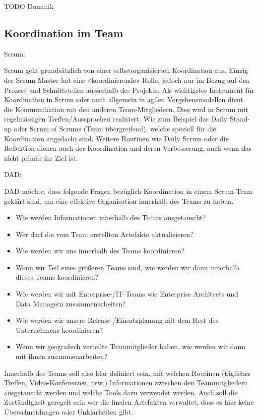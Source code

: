 TODO Dominik



\subsection{Koordination im Team}



{\Large Scrum:} \cite{planningReleaseScrum} \medskip

Scrum geht grundsätzlich von einer selbstorganisierten Koordination aus. Einzig der Scrum Master hat eine «koordinierende» Rolle, jedoch nur im Bezug auf den Prozess und Schnittstellen ausserhalb des Projekts.
Als wichtigstes Instrument für Koordination in Scrum oder auch allgemein in agilen Vorgehensmodellen dient die Kommunikation mit den anderen Team-Mitgliedern. Dies wird in Scrum mit regelmässigen Treffen/Aussprachen realisiert. Wie zum Beispiel das Daily Stand-up oder Scrum of Scrums (Team übergreifend), welche speziell für die Koordination angedacht sind. Weitere Routinen wie Daily Scrum oder die Reflektion dienen auch der Koordination und deren Verbesserung, auch wenn das nicht primär ihr Ziel ist.
\bigskip 

{\Large DAD:} \cite{planningReleaseDad} \medskip

DAD möchte, dass folgende Fragen bezüglich Koordination in einem Scrum-Team geklärt sind, um eine effektive Organisation innerhalb des Teams zu haben.
\begin{itemize}
	\item 	Wie werden Informationen innerhalb des Teams ausgetauscht?
	\item 	Wer darf die vom Team erstellten Artefakte aktualisieren? 
	\item 	Wie werden wir uns innerhalb des Teams koordinieren?
	\item 	Wenn wir Teil eines größeren Teams sind, wie werden wir dann innerhalb dieses Teams koordinieren?
	\item 	Wie werden wir mit Enterprise-/IT-Teams wie Enterprise Architects und Data Managern zusammenarbeiten?
	\item 	Wie werden wir unsere Release-/Einsatzplanung mit dem Rest des Unternehmens koordinieren?
	\item 	Wenn wir geografisch verteilte Teammitglieder haben, wie werden wir dann mit ihnen zusammenarbeiten?
\end{itemize}
Innerhalb des Teams soll also klar definiert sein, mit welchen Routinen (tägliches Treffen, Video-Konferenzen, usw.) Informationen zwischen den Teammitgliedern ausgetauscht werden und welche Tools dazu verwendet werden. Auch soll die Zuständigkeit geregelt sein wer die finalen Artefakten verwaltet, dass es hier keine Überschneidungen oder Unklarheiten gibt.
\medskip

